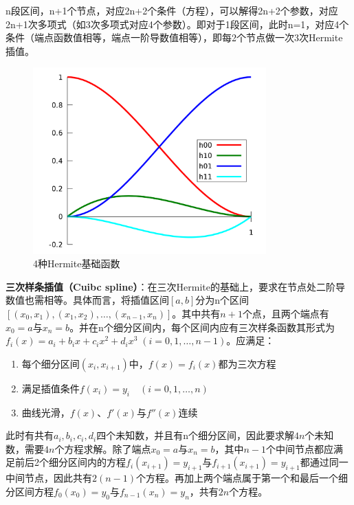 \documentclass[11pt]{article}
\begin{document}
n段区间，n+1个节点，对应2n+2个条件（方程），可以解得2n+2个参数，对应2n+1次多项式（如3次多项式对应4个参数）。即对于1段区间，此时n=1，对应4个条件（端点函数值相等，端点一阶导数值相等），即每2个节点做一次3次Hermite插值。

\begin{figure}[H]
    \centering
    \includegraphics[width=0.8\textwidth]{fig/hermite-spline.png}
	\caption{4种Hermite基础函数}
    \label{fig:herminte-spline}
\end{figure}

\textbf{三次样条插值（Cuibc spline）}：在三次Hermite的基础上，要求在节点处二阶导数值也需相等。具体而言，将插值区间$[a,b]$分为n个区间$[(x_0,x_1),(x_1,x_2),\dots,(x_{n-1},x_n)]$。其中共有$n+1$个点，且两个端点有$x_0=a$与$x_n=b$。并在n个细分区间内，每个区间内应有三次样条函数其形式为$f_i(x) = a_i+b_i x+c_i x^2+d_i x^3\;(i=0,1,\dots,n-1)$。应满足：
\begin{enumerate}
    \item 每个细分区间$(x_i,x_{i+1})$中，$f(x)=f_i(x)$都为三次方程
    \item 满足插值条件$f(x_i) = y_i \quad (i=0,1,\dots,n)$
    \item 曲线光滑，$f(x)$、$f'(x)$与$f''(x)$连续
\end{enumerate}

此时有共有$a_i,b_i,c_i,d_i$四个未知数，并且有n个细分区间，因此要求解$4n$个未知数，需要$4n$个方程求解。除了端点$x_0=a$与$x_n=b$，其中$n-1$个中间节点都应满足前后2个细分区间内的方程$f_i(x_{i+1})=y_{i+1}$与$f_{i+1}(x_{i+1})=y_{i+1}$都通过同一中间节点，因此共有$2(n-1)$个方程。再加上两个端点属于第一个和最后一个细分区间方程$f_0(x_0)=y_0$与$f_{n-1}(x_n)=y_n$，共有$2n$个方程。
\end{document}
